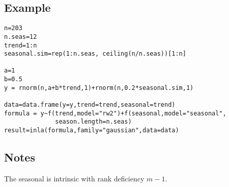 \documentclass[a4paper,11pt]{article}
\begin{document}
\subsection*{Example}

\begin{verbatim}
n=203
n.seas=12
trend=1:n
seasonal.sim=rep(1:n.seas, ceiling(n/n.seas))[1:n]

a=1
b=0.5
y = rnorm(n,a+b*trend,1)+rnorm(n,0.2*seasonal.sim,1)

data=data.frame(y=y,trend=trend,seasonal=trend)
formula = y~f(trend,model="rw2")+f(seasonal,model="seasonal",
              season.length=n.seas)
result=inla(formula,family="gaussian",data=data)
\end{verbatim}


\subsection*{Notes}

The seasonal is intrinsic with rank deficiency $m-1$.
\end{document}
